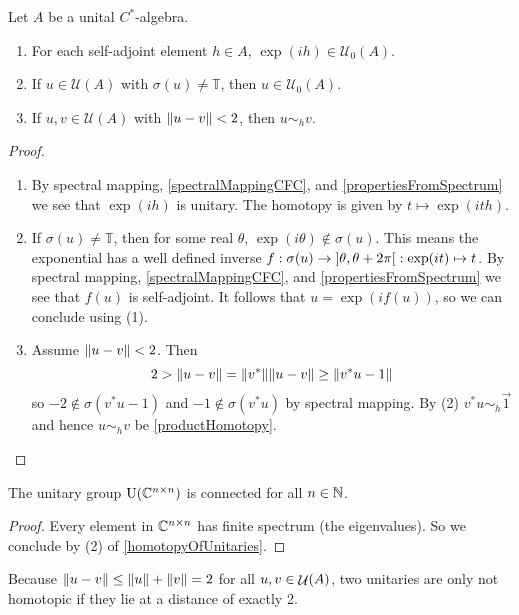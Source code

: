 \begin{lemma} \label{homotopyOfUnitaries}
Let $A$ be a unital $C^*$-algebra.
\begin{enumerate}
\item For each self-adjoint element $h\in A$, $\exp(ih)\in\mathcal{U}_0(A)$.
\item If $u\in \mathcal{U}(A)$ with $\sigma(u) \neq \mathbb{T}$, then $u\in\mathcal{U}_0(A)$.
\item If $u,v\in\mathcal{U}(A)$ with $\lVert u-v\rVert<2$, then $u\sim_h v$.
\end{enumerate}
\end{lemma}
\begin{proof} \hspace{1em}
\begin{enumerate}
\item By spectral mapping, \ref{spectralMappingCFC}, and \ref{propertiesFromSpectrum} we see that $\exp(ih)$ is unitary. The homotopy is given by $t\mapsto \exp(ith)$.
\item If $\sigma(u) \neq \mathbb{T}$, then for some real $\theta$, $\exp(i\theta)\notin \sigma(u)$. This means the exponential has a well defined inverse $f: \sigma(u) \to \interval[o]{\theta, \theta+2\pi}: \exp(it)\mapsto t$. By spectral mapping, \ref{spectralMappingCFC}, and \ref{propertiesFromSpectrum} we see that $f(u)$ is self-adjoint. It follows that $u = \exp(if(u))$, so we can conclude using (1).
\item Assume $\lVert u-v\rVert<2$. Then
\[ 2 > \lVert u-v\rVert = \lVert v^*\rVert\lVert u-v\rVert \geq \lVert v^*u - 1\rVert \]
so $-2\notin \sigma(v^*u-1)$ and $-1 \notin \sigma(v^*u)$ by spectral mapping. By (2) $v^*u \sim_h \vec{1}$ and hence $u\sim_h v$ be \ref{productHomotopy}.
\end{enumerate}
\end{proof}

\begin{corollary}
The unitary group $\operatorname{U}(\mathbb{C}^{n\times n})$ is connected for all $n\in\mathbb{N}$.
\end{corollary}
\begin{proof}
Every element in $\mathbb{C}^{n\times n}$ has finite spectrum (the eigenvalues). So we conclude by (2) of \ref{homotopyOfUnitaries}.
\end{proof}
Because $\lVert u-v\rVert\leq \lVert u\rVert+\lVert v\rVert = 2$ for all $u,v\in \mathop{\mathcal{U}}\nolimits(A)$, two unitaries are only not homotopic if they lie at a distance of exactly 2.

